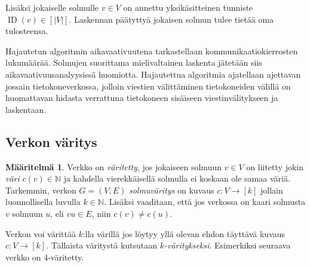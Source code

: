 \documentclass[finnish]{tktltiki2}
\theoremstyle{definition}
\newtheorem{maar}[lau]{Määritelmä}
\theoremstyle{remark}
\newcommand{\nat}{\mathbb{N}}
\newcommand{\from}{\colon}
\DeclareMathOperator{\id}{ID}
\begin{document}
Lisäksi jokaiselle solmulle $v \in V$ on annettu yksikäsitteinen tunniste
$\id(v) \in [|V|]$. Laskennan päätyttyä jokaisen solmun tulee
tietää oma tulosteensa.

Hajautetun algoritmin aikavaativuutena tarkastellaan kommunikaatiokierrosten
lukumäärää. Solmujen suorittama mielivaltainen laskenta jä\-te\-tään siis
aikavaativuusanalyysissä huomiotta. Hajautettua algoritmia ajatellaan ajettavan
jossain tietokoneverkossa, jolloin viestien välittäminen tietokoneiden välillä
on huomattavan hidasta verrattuna tietokoneen sisäiseen viestinvälitykseen ja
laskentaan.

\subsection{Verkon väritys}

\begin{maar}
    Verkko on \emph{väritetty}, jos jokaiseen solmuun $v \in V$ on liitetty
    jokin \emph{väri} $c(v) \in \nat$ ja kahdella vierekkäisellä solmulla ei
    koskaan ole samaa väriä.  Tarkemmin, verkon $G = (V,E)$ \emph{solmuväritys}
    on kuvaus $c \from V \to [k]$ jollain luonnollisella luvulla $k \in \nat$.
    Lisäksi vaaditaan, että jos verkossa on kaari solmusta $v$ solmuun $u$, eli
    $vu \in E$, niin $c(v) \neq c(u)$.
\end{maar}

Verkon voi värittää $k$:lla värillä jos löytyy yllä olevan ehdon täyttävä
kuvaus $c \from V \to [k]$. Tällaista väritystä kutsutaan
\emph{$k$-väritykseksi}. Esimerkiksi seuraava verkko on 4-väritetty.


\begin{center}
\end{center}
\end{document}
